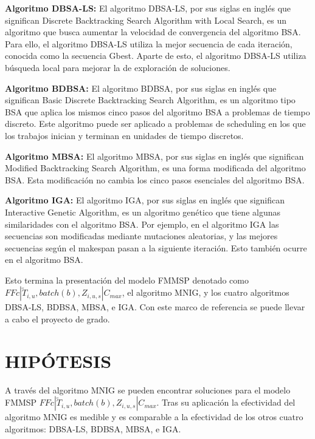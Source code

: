 \documentclass{article}
\def\notac_modelo{$FFc | \tilde{T}_{i, u}, batch(b), Z_{i, u, s} | C_{max}$}
\begin{document}
\vspace{\baselineskip}
\textbf{Algoritmo DBSA-LS:} El algoritmo DBSA-LS, por sus siglas en inglés que significan Discrete Backtracking Search Algorithm with Local Search, es un algoritmo que busca aumentar la velocidad de convergencia del algoritmo BSA. Para ello, el algoritmo DBSA-LS utiliza la mejor secuencia de cada iteración, conocida como la secuencia Gbest. Aparte de esto, el algoritmo DBSA-LS utiliza búsqueda local para mejorar la de exploración de soluciones. \autocite{modFMMSP}

\vspace{\baselineskip}
\textbf{Algoritmo BDBSA:} El algoritmo BDBSA, por sus siglas en inglés que significan Basic Discrete Backtracking Search Algorithm, es un algoritmo tipo BSA que aplica los mismos cinco pasos del algoritmo BSA a problemas de tiempo discreto. Este algoritmo puede ser aplicado a problemas de scheduling en los que los trabajos inician y terminan en unidades de tiempo discretos. \autocite{modFMMSP}

\vspace{\baselineskip}
\textbf{Algoritmo MBSA:} El algoritmo MBSA, por sus siglas en inglés que significan Modified Backtracking Search Algorithm, es una forma modificada del algoritmo BSA. Esta modificación no cambia los cinco pasos esenciales del algoritmo BSA. \autocite{modFMMSP}

\vspace{\baselineskip}
\textbf{Algoritmo IGA:} El algoritmo IGA, por sus siglas en inglés que significan Interactive Genetic Algorithm, es un algoritmo genético que tiene algunas similaridades con el algoritmo BSA. Por ejemplo, en el algoritmo IGA las secuencias son modificadas mediante mutaciones aleatorias, y las mejores secuencias según el makespan pasan a la siguiente iteración. Esto también ocurre en el algoritmo BSA. \autocite{modFMMSP}

\vspace{\baselineskip}
Esto termina la presentación del modelo FMMSP denotado como \linebreak \notac_modelo, el algoritmo MNIG, y los cuatro algoritmos DBSA-LS, BDBSA, MBSA, e IGA. Con este marco de referencia se puede llevar a cabo el proyecto de grado.

\section{HIPÓTESIS}

A través del algoritmo MNIG se pueden encontrar soluciones para el modelo FMMSP \notac_modelo. Tras su aplicación la efectividad del algoritmo MNIG es medible y es comparable a la efectividad de los otros cuatro algoritmos: DBSA-LS, BDBSA, MBSA, e IGA.
\end{document}
